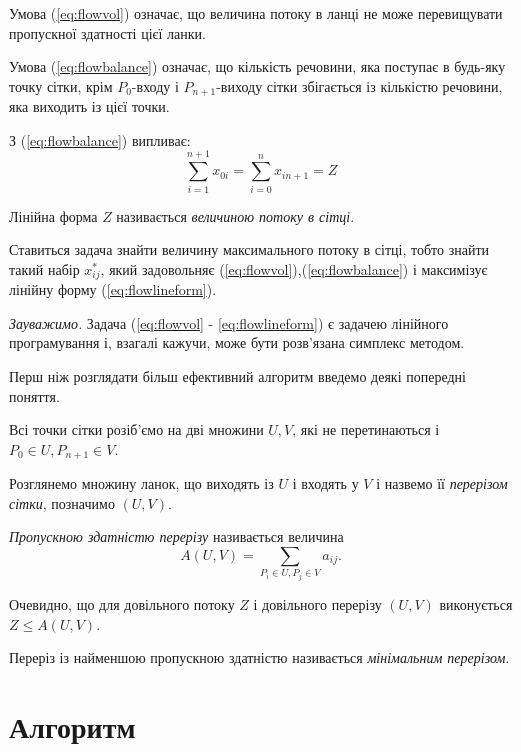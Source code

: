 \documentclass[12pt,a4paper]{report}
\begin{document}
Умова (\ref{eq:flowvol}) означає, що величина потоку в ланці не може перевищувати пропускної здатності цієї ланки.

Умова (\ref{eq:flowbalance}) означає, що кількість речовини, яка поступає в будь-яку точку сітки, крім $P_0$-входу і $P_{n+1}$-виходу сітки збігається із кількістю речовини, яка виходить із цієї точки.

З (\ref{eq:flowbalance}) випливає:
\begin{equation} \sum_{i=1}^{n+1} x_{0 i} = \sum_{i=0}^{n} x_{i n+1} = Z \label{eq:flowlineform} \end{equation}

Лінійна форма $Z$ називається \emph{величиною потоку в сітці}.

Ставиться задача знайти величину максимального потоку в сітці, тобто знайти такий набір $x_{ij}^*$, який задовольняє (\ref{eq:flowvol}),(\ref{eq:flowbalance}) і максимізує лінійну форму (\ref{eq:flowlineform}).

{\it Зауважимо.} Задача (\ref{eq:flowvol} - \ref{eq:flowlineform}) є задачею лінійного програмування і, взагалі кажучи, може бути розв’язана симплекс методом.

Перш ніж розглядати більш ефективний алгоритм введемо деякі попередні поняття.

Всі точки сітки розіб’ємо на дві множини $U, V$, які не перетинаються і $P_0 \in U, P_{n+1} \in V$.

Розглянемо множину ланок, що виходять із $U$ і входять у $V$ і назвемо її \emph{перерізом сітки}, позначимо $(U, V)$.

\emph{Пропускною здатністю перерізу} називається величина
\begin{equation} A(U, V) = \sum_{P_i \in U, P_j \in V} a_{ij}. \end{equation}

Очевидно, що для довільного потоку $Z$ і довільного перерізу $(U, V)$ виконується $Z \leq A(U, V)$.

Переріз із найменшою пропускною здатністю називається \emph{мінімальним перерізом}.

\section{Алгоритм}
\end{document}
